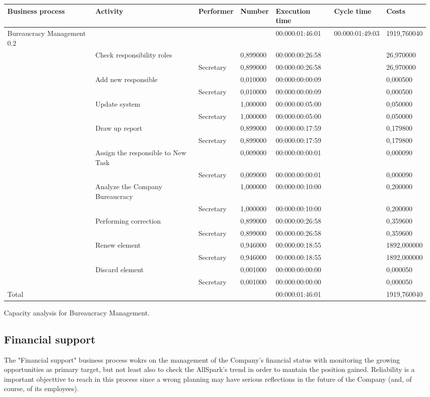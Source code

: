 \begin{landscape}
\centering
{\tiny
\begin{tabular}{|l|l|l|l|l|l|l|}
Business process&Activity&Performer&Number&Execution time&Cycle time&Costs\\
\hline
Bureaucracy Management 0.2&&&&00:000:01:46:01&00:000:01:49:03&1919,760040\\
\hline
&Check responsibility roles&&0,899000&00:000:00:26:58&&26,970000\\
\hline
&&Secretary&0,899000&00:000:00:26:58&&26,970000\\
\hline
&Add new responsible&&0,010000&00:000:00:00:09&&0,000500\\
\hline
&&Secretary&0,010000&00:000:00:00:09&&0,000500\\
\hline
&Update system&&1,000000&00:000:00:05:00&&0,050000\\
\hline
&&Secretary&1,000000&00:000:00:05:00&&0,050000\\
\hline
&Draw up report&&0,899000&00:000:00:17:59&&0,179800\\
\hline
&&Secretary&0,899000&00:000:00:17:59&&0,179800\\
\hline
&Assign the responsible to New Task&&0,009000&00:000:00:00:01&&0,000090\\
\hline
&&Secretary&0,009000&00:000:00:00:01&&0,000090\\
\hline
&Analyze the Company Bureaucracy&&1,000000&00:000:00:10:00&&0,200000\\
\hline
&&Secretary&1,000000&00:000:00:10:00&&0,200000\\
\hline
&Performing correction&&0,899000&00:000:00:26:58&&0,359600\\
\hline
&&Secretary&0,899000&00:000:00:26:58&&0,359600\\
\hline
&Renew element&&0,946000&00:000:00:18:55&&1892,000000\\
\hline
&&Secretary&0,946000&00:000:00:18:55&&1892,000000\\
\hline
&Discard element&&0,001000&00:000:00:00:00&&0,000050\\
\hline
&&Secretary&0,001000&00:000:00:00:00&&0,000050\\
\hline
Total&&&&00:000:01:46:01&&1919,760040
\end{tabular}
}
\caption{Capacity analysis for Bureaucracy Management.}
\end{landscape}
%

%

\subsection{Financial support}
The "Financial support" business process wokrs on the management of the Company's financial status with monitoring the growing opportunities as primary target, but not least also to check the AllSpark's trend in order to mantain the position gained. Reliability is a important objecttive to reach in this process since a wrong planning may have serious reflections in the future of the Company (and, of course, of its employees).

